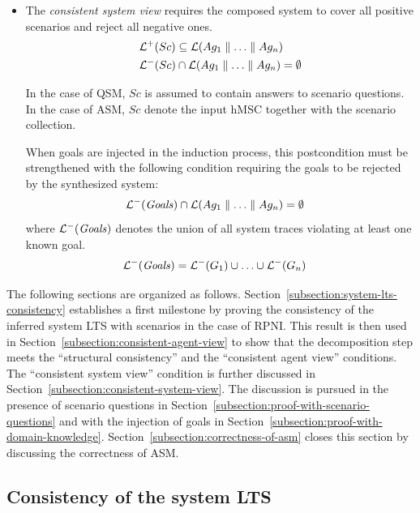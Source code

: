\begin{itemize}
\item The \emph{consistent system view} requires the composed system to cover all positive scenarios and reject all negative ones. 
\begin{align}
&\mathcal{L}^+(Sc) \subseteq \mathcal{L}(Ag_1 \parallel \ldots \parallel Ag_n)\label{proof:consistent-system-view-1}\\
&\mathcal{L}^-(Sc) \cap      \mathcal{L}(Ag_1 \parallel \ldots \parallel Ag_n) = \emptyset\label{proof:consistent-system-view-2}
\end{align}

In the case of QSM, $Sc$ is assumed to contain answers to scenario questions. In the case of ASM, $Sc$ denote the input hMSC together with the scenario collection.

When goals are injected in the induction process, this postcondition must be strengthened with the following condition requiring the goals to be rejected by the synthesized system:
\begin{align}
&\mathcal{L}^-(\mbox{\emph{Goals}}) \cap      \mathcal{L}(Ag_1 \parallel \ldots \parallel Ag_n) = \emptyset
\end{align}
where $\mathcal{L}^-(\mbox{\emph{Goals}})$ denotes the union of all system traces violating at least one known goal.
\begin{align}
&\mathcal{L}^-(\mbox{\emph{Goals}}) = \mathcal{L}^-(G_1) \cup \ldots \cup \mathcal{L}^-(G_n)
\end{align}

\end{itemize}

The following sections are organized as follows. Section~\ref{subsection:system-lts-consistency} establishes a first milestone by proving the consistency of the inferred system LTS with scenarios in the case of RPNI. This result is then used in Section~\ref{subsection:consistent-agent-view} to show that the decomposition step meets the ``structural consistency'' and the ``consistent agent view'' conditions. The ``consistent system view'' condition is further discussed in Section~\ref{subsection:consistent-system-view}. The discussion is pursued in the presence of scenario questions in Section~\ref{subsection:proof-with-scenario-questions} and with the injection of goals in Section~\ref{subsection:proof-with-domain-knowledge}. Section~\ref{subsection:correctness-of-asm} closes this section by discussing the correctness of ASM.


\subsection{Consistency of the system LTS\label{subsection:system-lts-consistency}}

